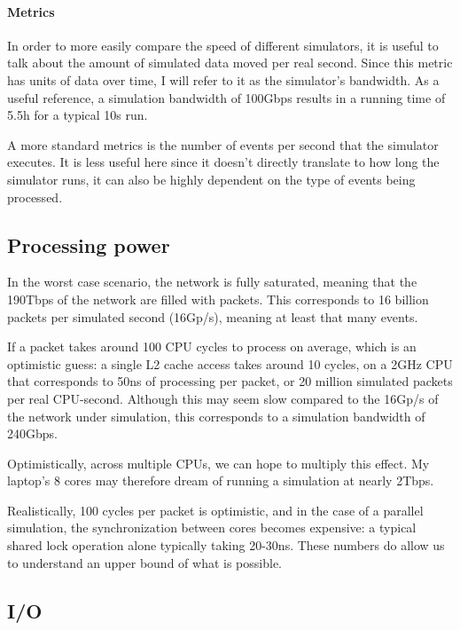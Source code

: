 \paragraph{Metrics}
In order to more easily compare the speed of different simulators, it is useful to talk about the amount of simulated data moved per real second.
Since this metric has units of data over time, I will refer to it as the simulator's bandwidth.
As a useful reference, a simulation bandwidth of 100Gbps results in a running time of 5.5h for a typical 10s run.

A more standard metrics is the number of events per second that the simulator executes.
It is less useful here since it doesn't directly translate to how long the simulator runs, it can also be highly dependent on the type of events being processed.


\subsection{Processing power} \label{limits-cpu}

In the worst case scenario, the network is fully saturated, meaning that the 190Tbps of the network are filled with packets.
This corresponds to 16 billion packets per simulated second (16Gp/s), meaning at least that many events.

If a packet takes around 100 CPU cycles to process on average, which is an optimistic guess: a single L2 cache access takes around 10 cycles, on a 2GHz CPU that corresponds to 50ns of processing per packet, or 20 million simulated packets per real CPU-second. %
Although this may seem slow compared to the 16Gp/s of the network under simulation, this corresponds to a simulation bandwidth of 240Gbps.

Optimistically, across multiple CPUs, we can hope to multiply this effect.
My laptop's 8 cores may therefore dream of running a simulation at nearly 2Tbps.

Realistically, 100 cycles per packet is optimistic, and in the case of a parallel simulation, the synchronization between cores becomes expensive: a typical shared lock operation alone typically taking 20-30ns.
These numbers do allow us to understand an upper bound of what is possible.



\subsection{I/O} \label{limits-io}

